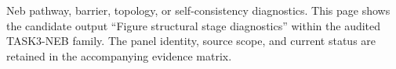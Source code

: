 Neb pathway, barrier, topology, or self-consistency diagnostics. This page shows the candidate output ``Figure structural stage diagnostics'' within the audited TASK3-NEB family. The panel identity, source scope, and current status are retained in the accompanying evidence matrix.
